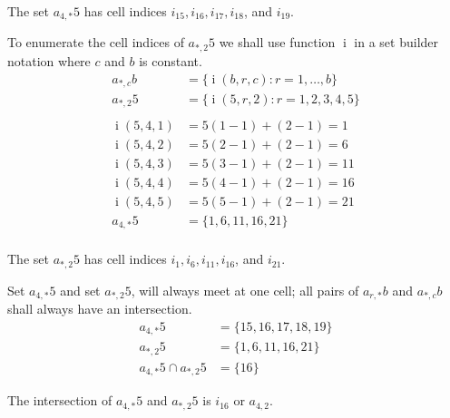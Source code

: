 \documentclass[twoside,openany,12pt]{book}
\begin{document}
    The set $a_{4,*}5$ has cell indices $i_{15}, i_{16}, i_{17}, i_{18}$, and $i_{19}$.

    To enumerate the cell indices of $a_{*,2}5$ we shall use function $\operatorname{i}$ in a set builder notation where $c$ and $b$ is constant.
    \begin{equation*}
        \begin{split}
            a_{*,c}b &= \{ \operatorname{i}(b,r,c) : r = 1, \dots, b \} \\
            a_{*,2}5 &= \{ \operatorname{i}(5,r,2) : r = 1,2,3,4,5 \} \\
            \\
            \operatorname{i}(5,4,1) &= 5(1-1) + (2 - 1) = 1 \\
            \operatorname{i}(5,4,2) &= 5(2-1) + (2 - 1) = 6 \\
            \operatorname{i}(5,4,3) &= 5(3-1) + (2 - 1) = 11 \\
            \operatorname{i}(5,4,4) &= 5(4-1) + (2 - 1) = 16 \\
            \operatorname{i}(5,4,5) &= 5(5-1) + (2 - 1) = 21 \\
            a_{4,*}5 &= \{1, 6, 11, 16, 21 \} \\
        \end{split}
    \end{equation*}

    The set $a_{*,2}5$ has cell indices $i_{1}, i_{6}, i_{11}, i_{16}$, and $i_{21}$.

    Set $a_{4,*}5$ and set $a_{*,2}5$, will always meet at one cell; all pairs of $a_{r,*}b$ and $a_{*,c}b$ shall always have an intersection.
    \begin{equation*}
        \begin{split}
            a_{4,*}5 &= \{15, 16, 17, 18, 19\} \\
            a_{*,2}5 &= \{1, 6, 11, 16, 21 \} \\
            a_{4,*}5 \cap a_{*,2}5 &= \{16\}
        \end{split}
    \end{equation*}

    The intersection of $a_{4,*}5$ and $a_{*,2}5$ is $i_{16}$ or $a_{4,2}$.
\end{document}
